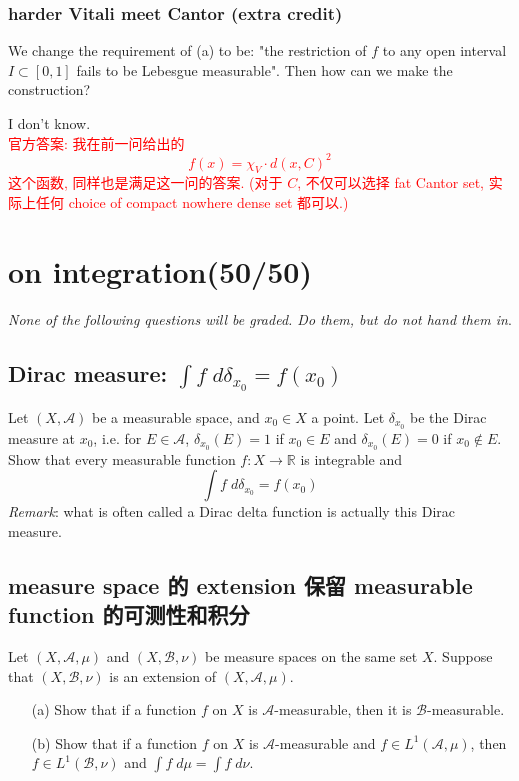 \documentclass[lang=cn,11pt]{elegantbook}
\begin{document}
\subsection{harder Vitali meet Cantor (extra credit)}
We change the requirement of (a) to be: "the restriction of $f$ to any open interval $I\subset[0,1]$ fails to be Lebesgue measurable". Then how can we make the construction?
\begin{solution}
    I don't know.\\
    \textcolor{red}{官方答案: 我在前一问给出的  \[ f(x) = \chi_V \cdot d(x,C)^2\] 这个函数, 同样也是满足这一问的答案. (对于 $C$, 不仅可以选择 fat Cantor set, 实际上任何 choice of compact nowhere dense set 都可以.) }
\end{solution}






\chapter{on integration(50/50)}
\begin{center}
\textit{None of the following questions will be graded. Do them, but do not hand them in}.
\end{center}

\section{Dirac measure: $\int f \; d\delta_{x_0}= f(x_0) $}
  Let $(X,\mathcal{A})$ be a measurable space, and $x_0\in X$ a point. 
  Let $\delta_{x_0}$ be the Dirac measure at $x_0$, i.e. for $E\in \mathcal{A}$, $\delta_{x_0}(E)=1$ if $x_0\in E$ and $\delta_{x_0}(E)=0$ if $x_0\notin E$. 
Show that every measurable function $f\colon X\to \mathbb{R}$ is integrable and 
\[
	\int f \; d\delta_{x_0}= f(x_0) 
\]
\textit{Remark}: what is often called a Dirac delta function is actually this Dirac measure. 

\section{measure space 的 extension 保留 measurable function 的可测性和积分}  
  Let $(X,\mathcal{A},\mu)$ and $(X,\mathcal{B},\nu)$ be measure spaces on the same set $X$. Suppose that $(X,\mathcal{B},\nu)$ is an extension of $(X,\mathcal{A},\mu)$. 
  \begin{itemize}
  \item[(a)] Show that if a function $f$ on $X$ is $\mathcal{A}$-measurable, then it is $\mathcal{B}$-measurable.
  \item[(b)] Show that if a function $f$ on $X$ is $\mathcal{A}$-measurable and $f\in L^1(\mathcal{A}, \mu)$, then $f\in L^1(\mathcal{B},\nu)$ and $\int f \; d\mu= \int f\; d \nu$. 
  \end{itemize}
\end{document}
